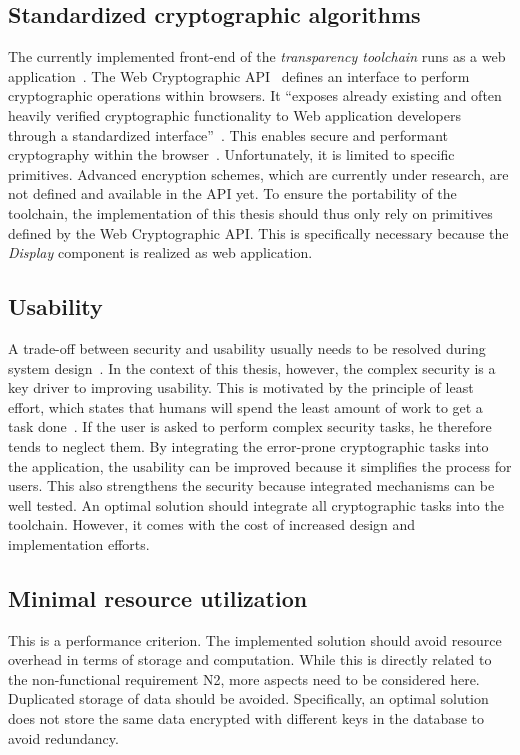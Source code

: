 \documentclass[../main.tex]{subfiles}
\begin{document}
\subsection{Standardized cryptographic algorithms}
The currently implemented front-end of the \emph{transparency toolchain} runs as a web application~\cite{Zieglmeier2021}. 
The Web Cryptographic API~\cite{WebCryptoApi2017} defines an interface to perform cryptographic operations within browsers. 
It \enquote{exposes already existing and often heavily verified cryptographic functionality to Web application developers through a standardized interface}~\cite[959]{Halpin2014}.
This enables secure and performant cryptography within the browser~\cite{Halpin2014}.
Unfortunately, it is limited to specific primitives. 
Advanced encryption schemes, which are currently under research, are not defined and available in the API yet.
To ensure the portability of the toolchain, the implementation of this thesis should thus only rely on primitives defined by the Web Cryptographic API.
This is specifically necessary because the \emph{Display} component is realized as web application.

\subsection{Usability}
A trade-off between security and usability usually needs to be resolved during system design~\cite{Braz2007}.
In the context of this thesis, however, the complex security is a key driver to improving usability.
This is motivated by the principle of least effort, which states that humans will spend the least amount of work to get a task done~\cite{Levenson2018}.
If the user is asked to perform complex security tasks, he therefore tends to neglect them.
By integrating the error-prone cryptographic tasks into the application, the usability can be improved because it simplifies the process for users.
This also strengthens the security because integrated mechanisms can be well tested.
An optimal solution should integrate all cryptographic tasks into the toolchain.
However, it comes with the cost of increased design and implementation efforts.

\subsection{Minimal resource utilization}
This is a performance criterion.
The implemented solution should avoid resource overhead in terms of storage and computation.
While this is directly related to the non-functional requirement N2, more aspects need to be considered here.
Duplicated storage of data should be avoided.
Specifically, an optimal solution does not store the same data encrypted with different keys in the database to avoid redundancy.
\end{document}
